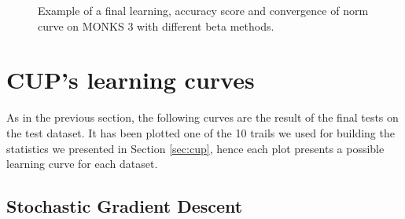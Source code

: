 \begin{appendices}
\begin{figure}[H]
\begin{subfigure}{0.40\textwidth}
                    \label{fig:monks_3_ACC_CGD}
                \end{subfigure}
                \begin{subfigure}{0.40\textwidth}
                    \caption{}
                    \label{fig:monks_3_NORM_CGD}
                \end{subfigure}
                \caption{Example of a final learning, accuracy score and convergence of norm curve on MONKS 3 with different beta methods.}
                \label{fig:monks_3_CGD}
            \end{figure}




    \chapter{CUP's learning curves} %
    \label{cha:cup_learning_curves}
        As in the previous section, the following curves are the result of the final tests on the test dataset. It has been plotted one of the 10 trails we used for building the statistics we presented in Section \ref{sec:cup}, hence each plot presents a possible learning curve for each dataset.

        \section{Stochastic Gradient Descent} %
        \label{sec:cup_sgd}


\end{appendices}
